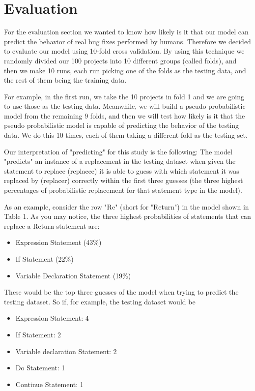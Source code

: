 
\section{Evaluation}\label{sec:stmtstudy}
For the evaluation section we wanted to know how likely is it that our model can predict the behavior of real bug fixes performed by humans.
Therefore we decided to evaluate our model using 10-fold cross validation. By using this technique we randomly divided our 100 projects into 10 different groups (called folds), and then we make 10 runs, each run picking one of the folds as the testing data, and the rest of them being the training data.

For example, in the first run, we take the 10 projects in fold 1 and we are going to use those as the testing data. Meanwhile, we will build a pseudo probabilistic model from the remaining 9 folds, and then we will test how likely is it that the pseudo probabilistic model is capable of predicting the behavior of the testing data. We do this 10 times, each of them taking a different fold as the testing set.

Our interpretation of "predicting" for this study is the following:
The model "predicts" an instance of a replacement in the testing dataset when given the statement to replace (replacee) it is able to guess with which statement it was replaced by (replacer) correctly within the first three guesses (the three highest percentages of probabilistic replacement for that statement type in the model).

As an example, consider the row "Re" (short for "Return") in the model shown in Table 1. As you may notice, the three highest probabilities of statements that can replace a Return statement are:
\begin{itemize}
  \item Expression Statement (43\%)
  \item If Statement (22\%)
  \item Variable Declaration Statement (19\%)
\end{itemize}
These would be the top three guesses of the model when trying to predict the testing dataset.
So if, for example, the testing dataset would be
\begin{itemize}
  \color{ForestGreen}  
  \item Expression Statement: 4
  \item If Statement: 2
  \item Variable declaration Statement: 2
    \color{red}  
  \item Do Statement: 1
  \item Continue Statement: 1
\end{itemize}

